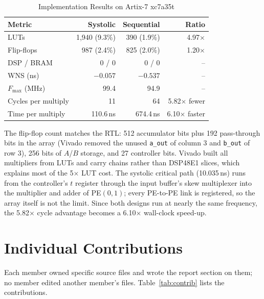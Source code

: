 \documentclass[conference]{IEEEtran}
\newcommand{\code}[1]{\texttt{#1}}
\begin{document}
\begin{table}[t]
  \centering
  \caption{Implementation Results on Artix-7 xc7a35t}
  \label{tab:synth}
  \footnotesize
  \setlength{\tabcolsep}{4pt}
  \begin{tabular}{@{}l r r r@{}}
    \toprule
    Metric & Systolic & Sequential & Ratio \\
    \midrule
    LUTs & 1,940 (9.3\%) & 390 (1.9\%) & 4.97$\times$ \\
    Flip-flops & 987 (2.4\%) & 825 (2.0\%) & 1.20$\times$ \\
    DSP / BRAM & 0 / 0 & 0 / 0 & -- \\
    WNS (ns) & $-0.057$ & $-0.537$ & -- \\
    $F_{\max}$ (MHz) & 99.4 & 94.9 & -- \\
    Cycles per multiply & 11 & 64 & 5.82$\times$ fewer \\
    Time per multiply & 110.6\,ns & 674.4\,ns & 6.10$\times$ faster \\
    \bottomrule
  \end{tabular}
\end{table}

The flip-flop count matches the RTL: 512 accumulator bits plus 192
pass-through bits in the array (Vivado removed the unused \code{a\_out} of
column 3 and \code{b\_out} of row 3), 256 bits of $A$/$B$ storage, and 27
controller bits. Vivado built all multipliers from LUTs and carry chains rather
than DSP48E1 slices, which explains most of the 5$\times$ LUT cost. The systolic
critical path (10.035\,ns) runs from the controller's $t$ register through the
input buffer's skew multiplexer into the multiplier and adder of PE$(0,1)$;
every PE-to-PE link is registered, so the array itself is not the limit. Since
both designs run at nearly the same frequency, the 5.82$\times$ cycle advantage
becomes a 6.10$\times$ wall-clock speed-up.

\section{Individual Contributions}\label{sec:contrib}
Each member owned specific source files and wrote the report section on them;
no member edited another member's files. Table~\ref{tab:contrib} lists the
contributions.
\end{document}
